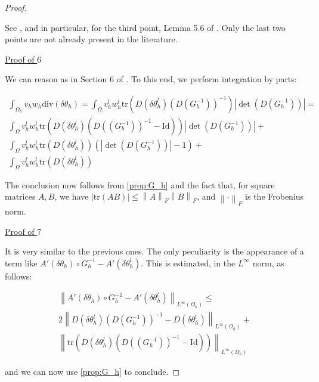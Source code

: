 \documentclass[english,a4paper,10pt,oneside]{scrbook}	%
\theoremstyle{break}
\newenvironment{mproof}[1][\proofname]{%
  \begin{proof}[#1]$ $\par\nobreak\ignorespaces
}{%
  \end{proof}
}
\renewcommand*{\proofname}{Proof}
\theoremstyle{remark}
\newcommand{\norm}[1]{\left\lVert#1\right\rVert}
\newcommand{\tr}{\text{tr}}
\newcommand{\id}{\text{Id}}
\newcommand{\te}{\theta}
\newcommand{\dive}{\text{div}}
\begin{document}
\begin{mproof}
See \cite{edelmann}, and in particular, for the third point, Lemma 5.6 of \cite{kovacs}. Only the last two points are not already present in the literature.

\underline{Proof of $6$}

We can reason as in Section 6 of \cite{elliott}. To this end, we perform integration by parts:

\begin{align*}
	\int_{\Omega_h}v_h w_h \dive(\delta \te_h) = \int_{\Omega}v_h^l w_h^l \tr(D(\delta \te_h^l)(D(G_h^{-1}))^{-1})|\det(D(G_h^{-1}))|=\\
	\int_{\Omega}v_h^l w_h^l \tr(D(\delta \te_h^l)(D((G_h^{-1}))^{-1} - \id))|\det(D(G_h^{-1}))|+\\
	\int_{\Omega}v_h^l w_h^l \tr(D(\delta \te_h^l))(|\det(D(G_h^{-1}))|-1)+\\
	\int_{\Omega}v_h^l w_h^l \tr(D(\delta \te_h^l))
\end{align*}

The conclusion now follows from \cref{prop:G_h} and the fact that, for square matrices $A,B$, we have $|\tr(AB)|\leq \norm{A}_F\norm{B}_F$, and $\norm{\cdot }_F$ is the Frobenius norm.

\underline{Proof of $7$}

It is very similar to the previous ones. The only peculiarity is the appearance of a term like $A'(\delta \te_h)\circ G_h^{-1} - A'(\delta \te_h^l)$. This is estimated, in the $L^\infty$ norm, as follows:

\begin{align*}
	\norm{A'(\delta \te_h)\circ G_h^{-1} - A'(\delta \te_h^l)}_{L^\infty(\Omega_h)}\leq\\
	2\norm{D(\delta \te_h^l)(D(G_h^{-1}))^{-1} - D(\delta \te_h^l)}_{L^\infty(\Omega_h)}+\\
	\norm{\tr(D(\delta \te_h^l)(D((G_h^{-1}))^{-1} - \id))}_{L^\infty(\Omega_h)}
\end{align*}

and we can now use \cref{prop:G_h} to conclude.

\end{mproof}
\end{document}

